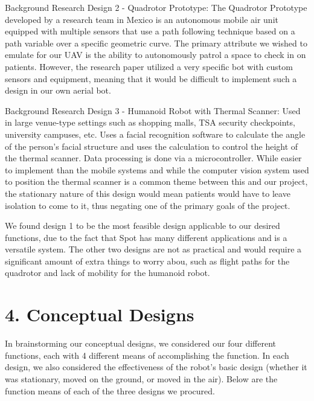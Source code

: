﻿\documentclass[10pt]{article}
\begin{document}
Background Research Design 2 - Quadrotor Prototype: The Quadrotor Prototype developed by a research team in Mexico is an autonomous mobile air unit equipped with multiple sensors that use a path following technique based on a path variable over a specific geometric curve. The primary attribute we wished to emulate for our UAV is the ability to autonomously patrol a space to check in on patients. However, the research paper utilized a very specific bot with custom sensors and equipment, meaning that it would be difficult to implement such a design in our own aerial bot. 

Background Research Design 3 - Humanoid Robot with Thermal Scanner: Used in large venue-type settings such as shopping malls, TSA security checkpoints, university campuses, etc. Uses a facial recognition software to calculate the angle of the person’s facial structure and uses the calculation to control the height of the thermal scanner.  Data processing is done via a microcontroller. While easier to implement than the mobile systems and while the computer vision system used to position the thermal scanner is a common theme between this and our project, the stationary nature of this design would mean patients would have to leave isolation to come to it, thus negating one of the primary goals of the project.

We found design 1 to be the most feasible design applicable to our desired functions, due to the fact that Spot has many different applications and is a versatile system. The other two designs are not as practical and would require a significant amount of extra things to worry abou, such as flight paths for the quadrotor and lack of mobility for the humanoid robot. 

\section{4. Conceptual Designs}
In brainstorming our conceptual designs, we considered our four different functions, each with 4 different means of accomplishing the function. In each design, we also considered the effectiveness of the robot’s basic design (whether it was stationary, moved on the ground, or moved in the air). Below are the function means of each of the three designs we procured.
\end{document}
